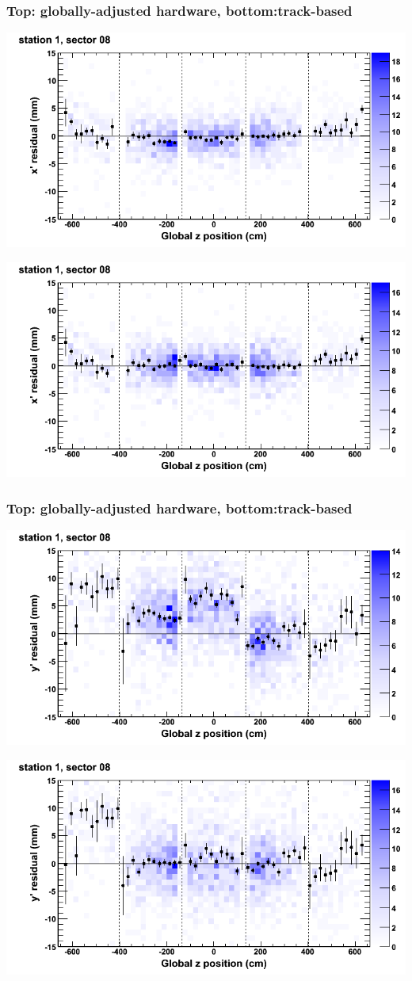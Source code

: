 \documentclass[compress]{beamer}
\begin{document}
\begin{frame}
\frametitle{Top: globally-adjusted hardware, bottom:track-based}
\includegraphics[width=0.7\linewidth]{NOV4_mapplots_HW/DTvsz_st1sec08_x.png}

\includegraphics[width=0.7\linewidth]{NOV4_mapplots/DTvsz_st1sec08_x.png}
\end{frame}

\begin{frame}
\frametitle{Top: globally-adjusted hardware, bottom:track-based}
\includegraphics[width=0.7\linewidth]{NOV4_mapplots_HW/DTvsz_st1sec08_y.png}

\includegraphics[width=0.7\linewidth]{NOV4_mapplots/DTvsz_st1sec08_y.png}
\end{frame}
\end{document}
